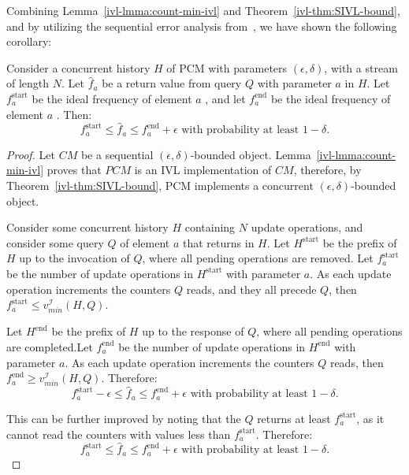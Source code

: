 Combining Lemma~\ref{ivl-lmma:count-min-ivl} and Theorem~\ref{ivl-thm:SIVL-bound}, and by utilizing the sequential
error analysis from~\cite{CountMin}, we have shown the following corollary:
\begin{corollary}
    Consider a concurrent history $H$ of PCM with parameters $(\epsilon, \delta)$, with a stream of length $N$.
    Let $\hat{f}_a$ be a return value from query $Q$ with parameter $a$ in $H$. Let $f_a^\text{start}$ be the ideal frequency of element $a$
    , and let $f_a^\text{end}$ be the ideal frequency of element $a$ . Then:
    \[ f_a^\text{start} \leq \hat{f}_a \leq f_a^\text{end} + \epsilon \text{ with probability at least } 1-\delta.\]
\end{corollary}
\begin{proof}
    Let $CM$ be a sequential $(\epsilon, \delta)$-bounded object. Lemma~\ref{ivl-lmma:count-min-ivl} proves that $PCM$
    is an IVL implementation of $CM$, therefore, by Theorem~\ref{ivl-thm:SIVL-bound}, PCM implements a concurrent
    $(\epsilon, \delta)$-bounded object.

    Consider some concurrent history $H$ containing $N$ update operations, and consider some query $Q$ of element $a$
    that returns in $H$. Let $H^{\text{start}}$ be the prefix of $H$ up to the invocation of $Q$, where all pending operations
    are removed. Let $f_a^\text{start}$ be the number of update operations in $H^{\text{start}}$ with parameter $a$. As each
    update operation increments the counters $Q$ reads, and they all precede $Q$, then $f_a^\text{start} \leq v^{\mathcal{I}}_{min}(H,Q)$.
    
    Let $H^{\text{end}}$ be the prefix of $H$ up to the response of $Q$, where all pending operations
    are completed.Let $f_a^\text{end}$ be the number of update operations in $H^{\text{end}}$ with parameter $a$. As each
    update operation increments the counters $Q$ reads, then $f_a^\text{end} \geq v^{\mathcal{I}}_{min}(H,Q)$.
    Therefore:
    \[ f_a^\text{start} - \epsilon \leq \hat{f}_a \leq f_a^\text{end} + \epsilon \text{ with probability at least } 1-\delta.\]

    This can be further improved by noting that the $Q$ returns at least $f_a^\text{start}$, as it cannot read the counters
    with values less than $f_a^\text{start}$. Therefore:
    \[ f_a^\text{start} \leq \hat{f}_a \leq f_a^\text{end} + \epsilon \text{ with probability at least } 1-\delta.\]
\end{proof}

